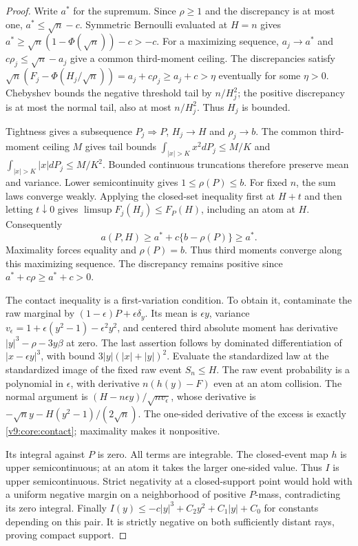 \begin{proof}
Write $a^*$ for the supremum. Since $\rho\ge1$ and the discrepancy is
at most one, $a^*\le\sqrt n-c$. Symmetric Bernoulli evaluated at $H=n$
gives $a^*\ge\sqrt n(1-\Phi(\sqrt n))-c>-c$.
For a maximizing sequence, $a_j\to a^*$ and
$c\rho_j\le\sqrt n-a_j$ give a common third-moment ceiling.
The discrepancies satisfy $\sqrt n(F_j-\Phi(H_j/\sqrt n))
=a_j+c\rho_j\ge a_j+c>\eta$ eventually for some $\eta>0$.
Chebyshev bounds the negative threshold tail by $n/H_j^2$;
the positive discrepancy is at most the normal tail, also at most
$n/H_j^2$. Thus $H_j$ is bounded.

Tightness gives a subsequence $P_j\Rightarrow P$, $H_j\to H$ and
$\rho_j\to b$. The common third-moment ceiling $M$ gives tail
bounds $\int_{|x|>K}x^2dP_j\le M/K$ and
$\int_{|x|>K}|x|dP_j\le M/K^2$. Bounded continuous truncations
therefore preserve mean and variance. Lower semicontinuity gives
$1\le\rho(P)\le b$. For fixed $n$, the sum laws converge weakly.
Applying the closed-set inequality first at $H+t$ and then letting
$t\downarrow0$ gives
$\limsup F_j(H_j)\le F_P(H)$, including an atom at $H$.
Consequently
\[
 a(P,H)\ge a^*+c\{b-\rho(P)\}\ge a^*.
\]
Maximality forces equality and $\rho(P)=b$. Thus third moments converge along this maximizing sequence. The discrepancy remains positive since $a^*+c\rho\ge a^*+c>0$.

The contact inequality is a first-variation condition. To obtain it,
contaminate the raw marginal by
$(1-\epsilon)P+\epsilon\delta_y$. Its mean is $\epsilon y$,
variance $v_\epsilon=1+\epsilon(y^2-1)-\epsilon^2y^2$, and centered
third absolute moment has derivative $|y|^3-\rho-3y\beta$ at zero.
The last assertion follows by dominated differentiation of
$|x-\epsilon y|^3$, with bound $3|y|(|x|+|y|)^2$.
Evaluate the standardized law at the standardized image of the fixed
raw event $S_n\le H$. The raw event probability is a polynomial in
$\epsilon$, with derivative $n(h(y)-F)$ even at an atom collision.
The normal argument is
$(H-n\epsilon y)/\sqrt{nv_\epsilon}$, whose derivative is
$-\sqrt n y-H(y^2-1)/(2\sqrt n)$.
The one-sided derivative of the excess is exactly \eqref{v9:core:contact};
maximality makes it nonpositive.

Its integral against $P$ is zero. All terms are integrable.
The closed-event map $h$ is upper semicontinuous; at an atom it takes
the larger one-sided value. Thus $I$ is upper semicontinuous. Strict
negativity at a closed-support point would hold with a uniform negative
margin on a neighborhood of positive $P$-mass, contradicting its zero
integral. Finally $I(y)\le-c|y|^3+C_2y^2+C_1|y|+C_0$ for constants
depending on this pair. It is strictly negative on both sufficiently
distant rays, proving compact support.
\end{proof}

